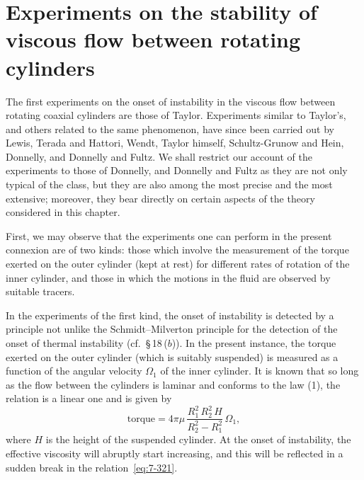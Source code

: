 
\section{Experiments on the stability of viscous flow between rotating cylinders}\label{sec:7-74}

The first experiments on the onset of instability in the viscous flow
between rotating coaxial cylinders are those of Taylor.  Experiments
similar to Taylor's, and others related to the same phenomenon, have
since been carried out by Lewis, Terada and Hattori, Wendt, Taylor
himself, Schultz-Grunow and Hein, Donnelly, and Donnelly and Fultz.
We shall restrict our account of the experiments to those of Donnelly,
and Donnelly and Fultz as they are not only typical of the class, but they
are also among the most precise and the most extensive; moreover, they
bear directly on certain aspects of the theory considered in this chapter.

First, we may observe that the experiments one can perform in the
present connexion are of two kinds: those which involve the measure\-ment
of the torque exerted on the outer cylinder (kept at rest) for different
rates of rotation of the inner cylinder, and those in which the motions in
the fluid are observed by suitable tracers.

In the experiments of the first kind, the onset of instability is detected
by a principle not unlike the Schmidt--Milverton principle for the
detection of the onset of thermal instability (cf.\ \S\,18\,($b$)).  In the present
instance, the torque exerted on the outer cylinder (which is suitably
suspended) is measured as a function of the angular velocity $\Omega_1$ of the
inner cylinder.  It is known that so long as the flow between the cylinders
is laminar and conforms to the law (1), the relation is a linear one and is
given by
\begin{equation}\label{eq:7-321}
\text{torque} = 4\pi\mu\,\frac{R_1^2\,R_2^2\,H}{R_2^2 - R_1^2}\,\Omega_1,
\end{equation}
where $H$ is the height of the suspended cylinder.  At the onset of instability,
the effective viscosity will abruptly start increasing, and this
will be reflected in a sudden break in the relation~\eqref{eq:7-321}.

